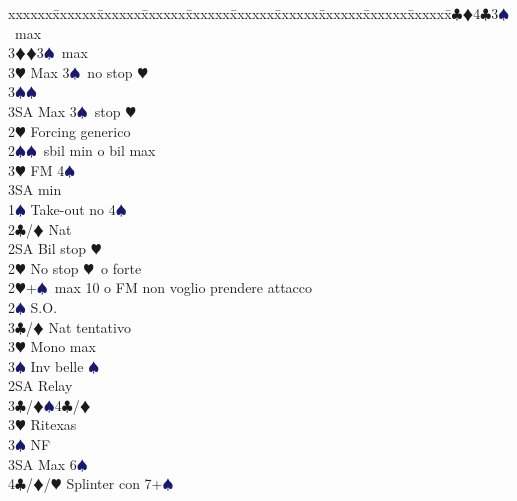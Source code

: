 \documentclass[a4paper,italian]{article}
\newcommand{\BC}{\textcolor{OliveGreen}{$\clubsuit$}}
\newcommand{\BD}{\textcolor{RedOrange}{$\vardiamondsuit$}}
\newcommand{\BH}{\textcolor{Red2}{$\varheartsuit${}}}
\newcommand{\BS}{\textcolor{MidnightBlue}{$\spadesuit${}}}
\newenvironment{bidtable}
{\begin{tabbing}

    xxxxxx\=xxxxxx\=xxxxxx\=xxxxxx\=xxxxxx\=xxxxxx\=xxxxxx\=xxxxxx\=xxxxxx\=xxxxxx\=\kill}
{\end{tabbing} }%
\begin{document}
\begin{multicols*}{2}
\begin{bidtable}
                                            3\BC {}\BD 4\BC 3\BS\ max\\
                                            3\BD {}\BD 3\BS\ max\\
                                            3\BH \> Max 3\BS\ no stop \BH \\
                                            3\BS {}\BS \\
                                            3SA \> Max 3\BS\ stop \BH \-\-\\
                                            2\BH \> Forcing generico\\
                                            2\BS {}\BS\ sbil min o bil max\\
                                            3\BH \> FM 4\BS \+\\
                                            3SA \> min\-\-\\
                                            1\BS \> Take-out no 4\BS \\
                                            2\BC/\BD \> Nat\+\\
                                            2SA \> Bil stop \BH \\
                                            2\BH \> No stop \BH\ o forte\-\\
                                            2\BH {}+\BS\ max 10 o FM non voglio prendere attacco\+\\
                                            2\BS \> S.O.\+\\
                                            3\BC/\BD \> Nat tentativo\\
                                            3\BH \> Mono max\\
                                            3\BS \> Inv belle \BS \-\\
                                            2SA \> Relay\+\\
                                            3\BC/\BD {}\BS 4\BC /\BD \\
                                            3\BH \> Ritexas\+\\
                                            3\BS \> NF\-\\
                                            3SA \> Max 6\BS \\
                                            4\BC/\BD/\BH \> Splinter con 7+\BS \-\\

\end{bidtable}
\end{multicols*}
\end{document}
